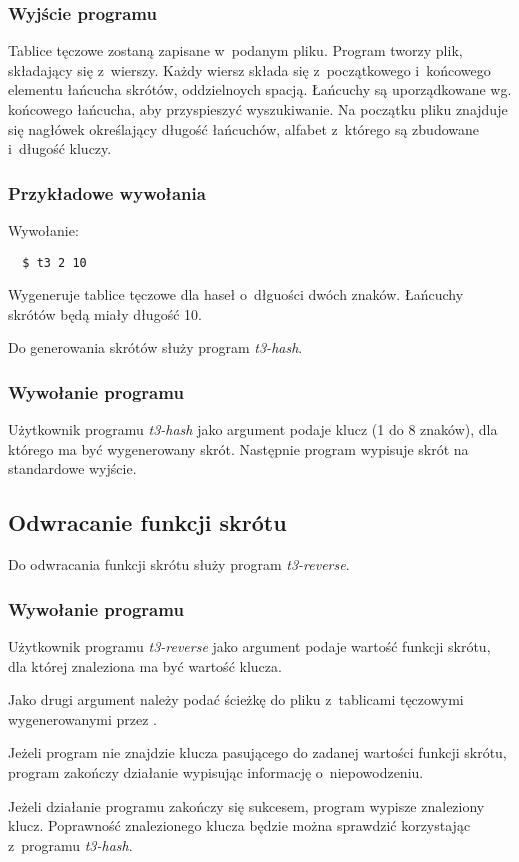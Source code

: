 \documentclass[a4paper]{scrartcl}
\begin{document}
\subsubsection{Wyjście programu}
Tablice tęczowe zostaną zapisane w~podanym pliku.
Program tworzy plik, składający się z~wierszy. Każdy wiersz składa się z~początkowego i~końcowego elementu łańcucha skrótów, oddzielnoych spacją.
Łańcuchy są uporządkowane wg. końcowego łańcucha, aby przyspieszyć wyszukiwanie.
Na początku pliku znajduje się nagłówek określający długość łańcuchów, alfabet z~którego są zbudowane i~długość kluczy.

\subsubsection{Przykładowe wywołania}
Wywołanie:
\begin{lstlisting}
  $ t3 2 10
\end{lstlisting}
Wygeneruje tablice tęczowe dla haseł o~dłguości dwóch znaków. Łańcuchy skrótów będą miały długość 10.

Do generowania skrótów służy program \emph{t3-hash}.
\subsubsection{Wywołanie programu}
Użytkownik programu \emph{t3-hash} jako argument podaje klucz (1 do 8 znaków), dla którego ma być wygenerowany skrót.
Następnie program wypisuje skrót na standardowe wyjście.

\subsection{Odwracanie funkcji skrótu}
Do odwracania funkcji skrótu służy program \emph{t3-reverse}.
\subsubsection{Wywołanie programu}
Użytkownik programu \emph{t3-reverse} jako argument podaje wartość funkcji skrótu, dla której znaleziona ma być wartość klucza.

Jako drugi argument należy podać ścieżkę do pliku z~tablicami tęczowymi wygenerowanymi przez \ttt.

Jeżeli program nie znajdzie klucza pasującego do zadanej wartości funkcji skrótu, program zakończy działanie wypisując informację o~niepowodzeniu.

Jeżeli działanie programu zakończy się sukcesem, program wypisze znaleziony klucz. Poprawność znalezionego klucza będzie można sprawdzić korzystając z~programu \emph{t3-hash}.
\end{document}
